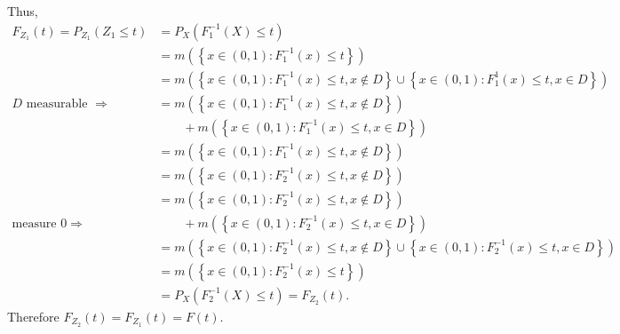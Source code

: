 \documentclass[12pt]{article}
\begin{document}
Thus,
\begin{align*}
F_{Z_{1}}(t) = P_{Z_{1}}(Z_{1} \leq t) & = P_{X}(F_{1}^{-1}(X) \leq t) \\
& = m\left( \left\{ x \in (0,1) : F_{1}^{-1}(x) \leq t \right\} \right) \\
& = m\left( \left\{ x \in (0,1) : F_{1}^{-1}(x) \leq t, x \notin D \right\}\cup\left\{ x \in (0,1) : F_{1}^{1}(x) \leq t, x \in D \right\} \right) \\
\text{$D$ measurable $\Rightarrow$} & = m\left( \left\{ x \in (0,1) : F_{1}^{-1}(x) \leq t, x \notin D \right\} \right) \\
& \qquad + m\left( \left\{ x \in (0,1) : F_{1}^{-1}(x) \leq t, x \in D \right\} \right) \\
& = m\left( \left\{ x \in (0,1) : F_{1}^{-1}(x) \leq t, x \notin D \right\} \right) \\
& = m\left( \left\{ x \in (0,1) : F_{2}^{-1}(x) \leq t, x \notin D \right\} \right) \\
& = m\left( \left\{ x \in (0,1) : F_{2}^{-1}(x) \leq t, x \notin D \right\} \right) \\
\text{measure $0 \Rightarrow$} & \qquad + m\left( \left\{ x \in (0,1) : F_{2}^{-1}(x) \leq t, x \in D \right\} \right) \\
& = m\left( \left\{ x \in (0,1) : F_{2}^{-1}(x) \leq t, x \notin D \right\} \cup \left\{ x \in (0,1) : F_{2}^{-1}(x) \leq t, x \in D \right\} \right)
\\
& = m\left( \left\{ x \in (0,1) : F_{2}^{-1}(x) \leq t \right\} \right) \\
& = P_{X}(F_{2}^{-1}(X) \leq t) = F_{Z_{2}}(t).
\end{align*}
Therefore $F_{Z_{2}}(t) = F_{Z_{1}}(t) = F(t)$.
\end{document}

